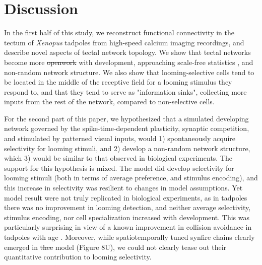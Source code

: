 \documentclass{article}
\providecommand{\DIFaddtex}[1]{{\protect\color{blue}{#1}}} %
\providecommand{\DIFdeltex}[1]{{\protect\color{red}\sout{#1}}}                      %
\providecommand{\DIFaddbegin}{} %
\providecommand{\DIFaddend}{} %
\providecommand{\DIFdelbegin}{} %
\providecommand{\DIFdelend}{} %
\providecommand{\DIFadd}[1]{\texorpdfstring{\DIFaddtex{#1}}{#1}} %
\providecommand{\DIFdel}[1]{\texorpdfstring{\DIFdeltex{#1}}{}} %
\newcommand{\DIFscaledelfig}{0.5}
\newlength{\DIFdelgraphicswidth} %
\newlength{\DIFdelgraphicsheight} %
\newcommand{\DIFaddincludegraphics}[2][]{{\color{blue}\fbox{\DIFOincludegraphics[#1]{#2}}}} %
\newcommand{\DIFdelincludegraphics}[2][]{%
\sbox{\DIFdelgraphicsbox}{\DIFOincludegraphics[#1]{#2}}%
\settoboxwidth{\DIFdelgraphicswidth}{\DIFdelgraphicsbox} %
\settoboxtotalheight{\DIFdelgraphicsheight}{\DIFdelgraphicsbox} %
\scalebox{\DIFscaledelfig}{%
\parbox[b]{\DIFdelgraphicswidth}{\usebox{\DIFdelgraphicsbox}\\[-\baselineskip] \rule{\DIFdelgraphicswidth}{0em}}\llap{\resizebox{\DIFdelgraphicswidth}{\DIFdelgraphicsheight}{%
\setlength{\unitlength}{\DIFdelgraphicswidth}%
\begin{picture}(1,1)%
\thicklines\linethickness{2pt} %
{\color[rgb]{1,0,0}\put(0,0){\framebox(1,1){}}}%
{\color[rgb]{1,0,0}\put(0,0){\line( 1,1){1}}}%
{\color[rgb]{1,0,0}\put(0,1){\line(1,-1){1}}}%
\end{picture}%
}\hspace*{3pt}}} %
} %
\DeclareRobustCommand{\DIFaddbegin}{\DIFOaddbegin \let\includegraphics\DIFaddincludegraphics} %
\DeclareRobustCommand{\DIFaddend}{\DIFOaddend \let\includegraphics\DIFOincludegraphics} %
\DeclareRobustCommand{\DIFdelbegin}{\DIFOdelbegin \let\includegraphics\DIFdelincludegraphics} %
\DeclareRobustCommand{\DIFdelend}{\DIFOaddend \let\includegraphics\DIFOincludegraphics} %
\begin{document}
\section*{Discussion}

In the first half of this study, we reconstruct functional connectivity in the tectum of \textit{Xenopus} tadpoles from high-speed calcium imaging recordings, and describe novel aspects of tectal network topology. We show that tectal networks become more \DIFdelbegin \DIFdel{openwork }\DIFdelend \DIFaddbegin \DIFadd{delicate and open-work }\DIFaddend with development, approaching scale-free statistics \DIFaddbegin \DIFadd{(with degrees following a power distribution with $\gamma >$ 2)}\DIFaddend , and non-random network structure. We also show that looming-selective cells tend to be located in the middle of the receptive field for a looming stimulus they respond to, and that they tend to serve as "information sinks", collecting more inputs from the rest of the network, compared to non-selective cells.

For the second part of this paper, we hypothesized that a simulated developing network governed by the spike-time-dependent plasticity, synaptic competition, and stimulated by patterned visual inputs, would 1) spontaneously acquire selectivity for looming stimuli, and 2) develop a non-random network structure, which 3) would be similar to that observed in biological experiments. The support for this hypothesis is mixed. The model did develop selectivity for looming stimuli (both in terms of average preference, and stimulus encoding), and this increase in selectivity was resilient to changes in model assumptions. Yet model result were not truly replicated in biological experiments, as in tadpoles there was no improvement in looming detection, and neither average selectivity, stimulus encoding, nor cell specialization increased with development. This was particularly surprising in view of a known improvement in collision avoidance in tadpoles with age \citep{dong2009}. Moreover, while spatiotemporally tuned synfire chains clearly emerged in \DIFdelbegin \DIFdel{thee }\DIFdelend \DIFaddbegin \DIFadd{the }\DIFaddend model (Figure 8U), we could not clearly tease out their quantitative contribution to looming selectivity.
\end{document}

